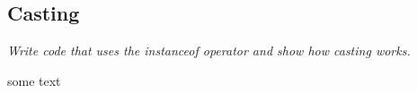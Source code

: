 \subsection{Casting}
\textit{Write code that uses the instanceof operator and show how casting works.}

some text


